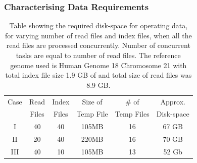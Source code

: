 \documentclass{acm_proc_article-sp}
\begin{document}


 
\subsubsection{Characterising Data Requirements}




\begin{table}
 \begin{tabular}{|c|c|c|c|c|c|} 
 \hline 
Case &Read& Index& Size of&  \# of & Approx.  \\
 &Files &  Files  & Temp File & Temp Files & Disk-space\\
 \hline
I&40 & 40 &105MB & 16 &67 GB \\
II&20 & 40 & 220MB & 16 &70 GB \\
III&40 & 10 & 105MB & 13 &52 Gb \\ 
 \hline
 \end{tabular}

 \caption{Table showing the required disk-space for operating data,
   for varying number of read files and index files, when all the read
   files are processed concurrently.  Number of concurrent tasks are
   equal to number of read files. The reference genome used is Human
   Genome 18 Chromosome 21 with total index file size 1.9 GB of and
   total size of read files was 8.9 GB.}
    \label{table:dynamic-diskspace} 
\end{table}
\end{document}
